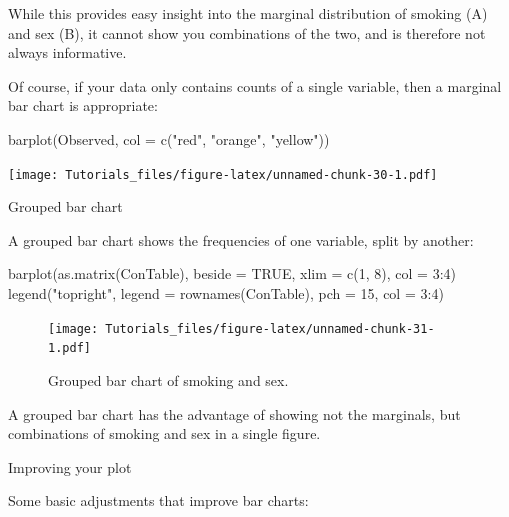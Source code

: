 \documentclass[
]{book}
\newenvironment{Shaded}{\begin{snugshade}}{\end{snugshade}}
\newcommand{\AttributeTok}[1]{\textcolor[rgb]{0.77,0.63,0.00}{#1}}
\newcommand{\ConstantTok}[1]{\textcolor[rgb]{0.00,0.00,0.00}{#1}}
\newcommand{\DecValTok}[1]{\textcolor[rgb]{0.00,0.00,0.81}{#1}}
\newcommand{\FunctionTok}[1]{\textcolor[rgb]{0.00,0.00,0.00}{#1}}
\newcommand{\NormalTok}[1]{#1}
\newcommand{\SpecialCharTok}[1]{\textcolor[rgb]{0.00,0.00,0.00}{#1}}
\newcommand{\StringTok}[1]{\textcolor[rgb]{0.31,0.60,0.02}{#1}}
\begin{document}
While this provides easy insight into the marginal distribution of smoking (A) and sex (B), it cannot show you combinations of the two, and is therefore not always informative.

Of course, if your data only contains counts of a single variable, then a marginal bar chart is appropriate:

\begin{Shaded}
\begin{Highlighting}[]
\FunctionTok{barplot}\NormalTok{(Observed, }\AttributeTok{col =} \FunctionTok{c}\NormalTok{(}\StringTok{"red"}\NormalTok{, }\StringTok{"orange"}\NormalTok{, }\StringTok{"yellow"}\NormalTok{))}
\end{Highlighting}
\end{Shaded}

\texttt{[image: Tutorials\_files/figure-latex/unnamed-chunk-30-1.pdf]}

Grouped bar chart

A grouped bar chart shows the frequencies of one variable, split by another:

\begin{Shaded}
\begin{Highlighting}[]
\FunctionTok{barplot}\NormalTok{(}\FunctionTok{as.matrix}\NormalTok{(ConTable), }\AttributeTok{beside =} \ConstantTok{TRUE}\NormalTok{, }\AttributeTok{xlim =} \FunctionTok{c}\NormalTok{(}\DecValTok{1}\NormalTok{, }\DecValTok{8}\NormalTok{), }\AttributeTok{col =} \DecValTok{3}\SpecialCharTok{:}\DecValTok{4}\NormalTok{)}
\FunctionTok{legend}\NormalTok{(}\StringTok{"topright"}\NormalTok{, }\AttributeTok{legend =} \FunctionTok{rownames}\NormalTok{(ConTable), }\AttributeTok{pch =} \DecValTok{15}\NormalTok{, }\AttributeTok{col =} \DecValTok{3}\SpecialCharTok{:}\DecValTok{4}\NormalTok{)}
\end{Highlighting}
\end{Shaded}

\begin{figure}
\centering
\texttt{[image: Tutorials\_files/figure-latex/unnamed-chunk-31-1.pdf]}
\caption{\label{fig:unnamed-chunk-31}Grouped bar chart of smoking and sex.}
\end{figure}

A grouped bar chart has the advantage of showing not the marginals, but combinations of smoking and sex in a single figure.

Improving your plot

Some basic adjustments that improve bar charts:
\end{document}
